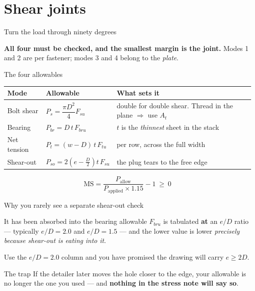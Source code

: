 \documentclass[aspectratio=169,10pt]{beamer}
\begin{document}
\section{Shear joints}

\begin{frame}{Turn the load through ninety degrees}
\centering
\resizebox{0.98\textwidth}{!}{}
\vfill
\raggedright
\textbf{All four must be checked, and the smallest margin is the joint.} Modes 1 and 2 are per
fastener; modes 3 and 4 belong to the \emph{plate}.
\end{frame}

\begin{frame}{The four allowables}
\centering\footnotesize
\begin{tabular}{@{}lll@{}}
\toprule
Mode & Allowable & What sets it\\
\midrule
Bolt shear & $P_s=\dfrac{\pi D^2}{4}F_{su}$ & double for double shear.
  \alert{Thread in the plane $\Rightarrow$ use $A_t$}\\[6pt]
Bearing & $P_{br}=D\,t\,F_{bru}$ & $t$ is the \emph{thinnest} sheet in the stack\\[4pt]
Net tension & $P_t=(w-D)\,t\,F_{tu}$ & per row, across the full width\\[4pt]
Shear-out & $P_{so}=2\left(e-\tfrac{D}{2}\right)t\,F_{su}$ & the plug tears to the free edge\\
\bottomrule
\end{tabular}
\vfill
\raggedright
\[
\mathrm{MS}=\frac{P_{\text{allow}}}{P_{\text{applied}}\times 1.15}-1 \ \ge\ 0
\]
\end{frame}

\begin{frame}{Why you rarely see a separate shear-out check}
\begin{alertblock}{It has been absorbed into the bearing allowable}
$F_{bru}$ is tabulated \textbf{at} an $e/D$ ratio --- typically $e/D=2.0$ and $e/D=1.5$ --- and the
lower value is lower \emph{precisely because shear-out is eating into it}.
\end{alertblock}
\vfill
Use the $e/D=2.0$ column and you have promised the drawing will carry $e \ge 2D$.
\vfill
\begin{alertblock}{The trap}
If the detailer later moves the hole closer to the edge, your allowable is no longer the one you
used --- and \textbf{nothing in the stress note will say so}.
\end{alertblock}
\end{frame}
\end{document}
